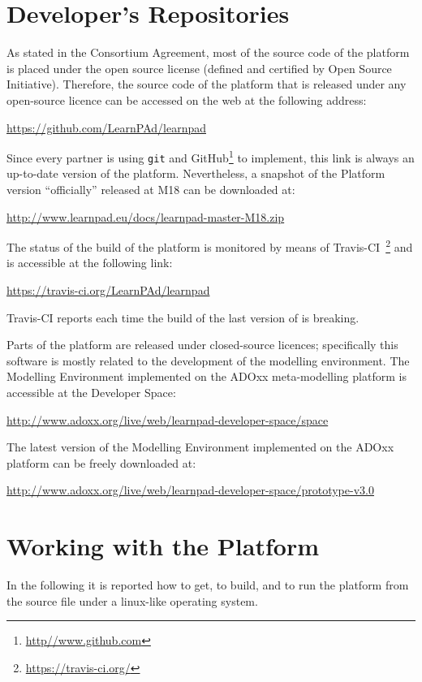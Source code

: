 \documentclass{learnpad}
\begin{document}
\chapter{Developer's Repositories}
\label{ch:sourcecode}

As stated in the Consortium Agreement, most of the source code of the 
platform is placed under the open source license (defined and certified by Open 
Source Initiative). Therefore, the source code of the \learnpad platform that 
is released under any open-source licence can be accessed on the web at the 
following address:

\url{https://github.com/LearnPAd/learnpad}

Since every partner is using \texttt{git} and 
GitHub\footnote{\url{http//www.github.com}} to implement, this link is
always an up-to-date version of the \learnpad platform.
Nevertheless, a snapshot of the \learnpad Platform version ``officially'' released at M18 
can be downloaded at:

\url{http://www.learnpad.eu/docs/learnpad-master-M18.zip}

The status of the build of the platform is monitored by means of 
Travis-CI~\footnote{\url{https://travis-ci.org/}} and is accessible at the 
following link:

\url{https://travis-ci.org/LearnPAd/learnpad}

Travis-CI reports each time the build of the last version of \learnpad is
breaking.

Parts of the \learnpad platform are released under closed-source licences; 
specifically this software is mostly related to the development of the modelling 
environment. The \learnpad Modelling Environment implemented on the ADOxx 
meta-modelling platform is accessible at the \learnpad Developer Space:
 
\url{http://www.adoxx.org/live/web/learnpad-developer-space/space}

The latest version of the \learnpad Modelling Environment implemented on the 
ADOxx platform can be freely downloaded at:

\url{http://www.adoxx.org/live/web/learnpad-developer-space/prototype-v3.0}

\chapter{Working with the \learnpad Platform}
\label{ch:platform}

In the following it is reported how to get, to build, and to
run the \learnpad platform from the source file under a linux-like
operating system.
\end{document}

